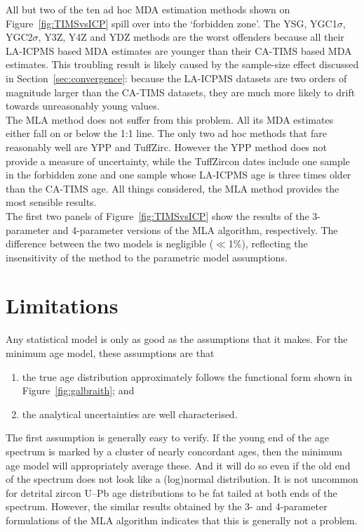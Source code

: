 \documentclass{article}
\begin{document}
All but two of the ten ad hoc MDA estimation methods shown on
Figure~\ref{fig:TIMSvsICP} spill over into the `forbidden zone'.  The
YSG, YGC1$\sigma$, YGC2$\sigma$, Y3Z, Y4Z and YDZ methods are the
worst offenders because all their LA-ICPMS based MDA estimates are
younger than their CA-TIMS based MDA estimates. This troubling result
is likely caused by the sample-size effect discussed in
Section~\ref{sec:convergence}: because the LA-ICPMS datasets are two
orders of magnitude larger than the CA-TIMS datasets, they are much
more likely to drift towards unreasonably young values.\\

The MLA method does not suffer from this problem. All its MDA
estimates either fall on or below the 1:1 line. The only two ad hoc
methods that fare reasonably well are YPP and TuffZirc.  However the
YPP method does not provide a measure of uncertainty, while the
TuffZircon dates include one sample in the forbidden zone and one
sample whose LA-ICPMS age is three times older than the CA-TIMS
age. All things considered, the MLA method provides the most sensible
results.\\

The first two panels of Figure~\ref{fig:TIMSvsICP} show the results of
the 3-parameter and 4-parameter versions of the MLA algorithm,
respectively.  The difference between the two models is negligible
($\ll$1\%), reflecting the insensitivity of the method to the
parametric model assumptions.

\section{Limitations}
\label{sec:limitations}

Any statistical model is only as good as the assumptions that it
makes. For the minimum age model, these assumptions are that

\begin{enumerate}
\item the true age distribution approximately follows the functional
  form shown in Figure~\ref{fig:galbraith}; and
\item the analytical uncertainties are well characterised.
\end{enumerate}

The first assumption is generally easy to verify. If the young end of
the age spectrum is marked by a cluster of nearly concordant ages,
then the minimum age model will appropriately average these. And it
will do so even if the old end of the spectrum does not look like a
(log)normal distribution. It is not uncommon for detrital zircon U--Pb
age distributions to be fat tailed at both ends of the
spectrum. However, the similar results obtained by the 3- and
4-parameter formulations of the MLA algorithm indicates that this is
generally not a problem.\\
\end{document}

